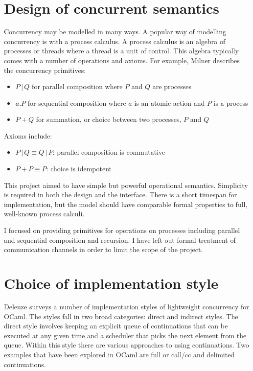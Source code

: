 \documentclass[12pt,twoside,notitlepage]{report}
\theoremstyle{plain}%
\theoremstyle{definition}
\theoremstyle{remark}
\begin{document}
\section{Design of concurrent semantics}
Concurrency may be modelled in many ways. A popular way of modelling concurrency is with a process calculus. A process calculus is an algebra of processes or threads where a thread is a unit of control. This algebra typically comes with a number of operations and axioms.  For example, Milner\cite{milner1982calculus} describes the concurrency primitives:
\begin{itemize}
\item{$ P\, | \, Q $  for parallel composition where $ P $ and $ Q $ are processes}
\item{ $ a.P  $ for sequential composition where $ a $ is an atomic action and $ P $ is a process}
\item{$ P+Q $ for summation, or choice between two processes, $ P$ and $ Q $}
\end{itemize}

Axioms include:
\begin{itemize}
\item{$ P\, | \, Q \equiv  Q\, | \, P  $: parallel composition is commutative}
\item{$ P+P \equiv P $: choice is idempotent}
\end{itemize}


This project aimed to have simple but powerful operational semantics. Simplicity is required in both the design and the interface. There is a short timespan for implementation, but the model should have comparable formal properties to full, well-known process calculi. 

I focused on providing primitives for operations on processes including parallel and sequential composition and recursion. I have left out formal treatment of communication channels in order to limit the scope of the project.  


\section{Choice of implementation style}  
Deleuze\cite{deleuzelight} surveys a number of implementation styles of lightweight concurrency for OCaml. The styles fall in two broad categories: direct and indirect styles. The direct style involves keeping an explicit queue of continuations that can be executed at any given time and a scheduler that picks the next element from the queue.  Within this style there are various approaches to using continuations. Two examples that have been explored in OCaml are full or call/cc and delimited continuations. 
\end{document}
